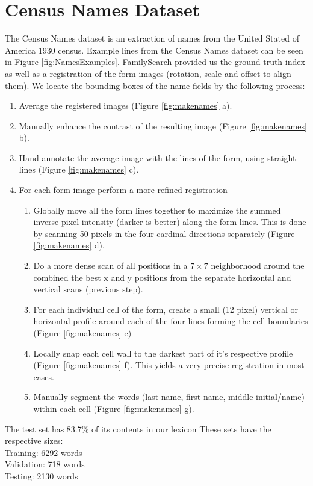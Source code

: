 \documentclass[ms,electronic,twosidetoc,letterpaper,chaptercenter,parttop,lof,lot]{byumsphd}
\begin{document}
\section{Census Names Dataset}

The Census Names dataset is an extraction of names from the United Stated of America 1930 census. Example lines from the Census Names dataset can be seen in Figure \ref{fig:NamesExamples}. FamilySearch provided us the ground truth index as well as a  registration of the form images (rotation, scale and offset to align them). We locate the bounding boxes of the name fields by the following process:
\begin{enumerate}
 \item Average the registered images (Figure \ref{fig:makenames} a).
 \item Manually enhance the contrast of the resulting image (Figure \ref{fig:makenames} b). 
 \item Hand annotate the average image with the lines of the form, using straight lines (Figure \ref{fig:makenames} c). 
 \item For each form image perform a more refined registration %
 \begin{enumerate}
  \item Globally move all the form lines together to maximize the summed inverse pixel intensity (darker is better) along the form lines. This is done by scanning 50 pixels in the four cardinal directions separately (Figure \ref{fig:makenames} d). 
  \item Do a more dense scan of all positions in a $7\times 7$ neighborhood around the combined the best x and y positions from the separate horizontal and vertical scans (previous step). %
  \item For each individual cell of the form, create a small (12 pixel) vertical or horizontal profile  around each of the four lines forming the cell boundaries (Figure \ref{fig:makenames} e) 
  \item Locally snap each cell wall to the darkest part of it's respective profile (Figure \ref{fig:makenames} f). This yields a very precise registration in most cases. 
  \item Manually segment the words (last name, first name, middle initial/name) within each cell (Figure \ref{fig:makenames} g). 
 \end{enumerate}
\end{enumerate}
The test set has 83.7\% of its contents in our lexicon
These sets have the respective sizes:\\
\indent \indent Training: 6292 words\\
\indent \indent Validation: 718 words\\
\indent \indent Testing: 2130 words
\end{document}
